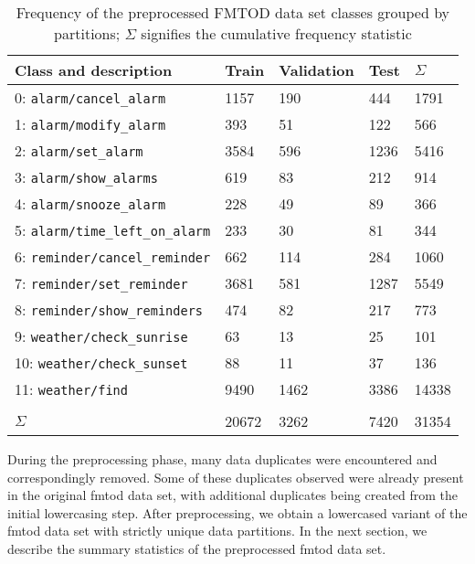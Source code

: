 \begin{table}[t!]
  \centering
  \begin{tabular}{lllll}
    \toprule
    Class and description & Train & Validation & Test & $\Sigma$ \\
    \midrule
    0: \texttt{alarm/cancel\_alarm} & 1157 & 190 & 444 & 1791 \\
    1: \texttt{alarm/modify\_alarm} & 393 & 51 & 122 & 566 \\
    2: \texttt{alarm/set\_alarm} & 3584 & 596 & 1236 & 5416 \\
    3: \texttt{alarm/show\_alarms} & 619 & 83 & 212 & 914 \\
    4: \texttt{alarm/snooze\_alarm} & 228 & 49 & 89 & 366 \\
    5: \texttt{alarm/time\_left\_on\_alarm} & 233 & 30 & 81 & 344 \\
    6: \texttt{reminder/cancel\_reminder} & 662 & 114 & 284 & 1060 \\
    7: \texttt{reminder/set\_reminder} & 3681 & 581 & 1287 & 5549 \\
    8: \texttt{reminder/show\_reminders} & 474 & 82 & 217 & 773 \\
    9: \texttt{weather/check\_sunrise} & 63 & 13 & 25 & 101 \\
    10: \texttt{weather/check\_sunset} & 88 & 11 & 37 & 136 \\
    11: \texttt{weather/find} & 9490 & 1462 & 3386 & 14338 \\[5pt]
    \hline \hline \\[-10pt]
    $\Sigma$ & 20672 & 3262 & 7420 & 31354 \\
    \bottomrule
  \end{tabular}
  \caption{Frequency of the preprocessed FMTOD data set classes grouped by
    partitions; $\Sigma$ signifies the cumulative frequency statistic}
  \label{tab:fmtod}
\end{table}

During the preprocessing phase, many data duplicates were encountered and
correspondingly removed. Some of these duplicates observed were already present
in the original \ac{fmtod} data set, with additional duplicates being created from
the initial lowercasing step. After preprocessing, we obtain a lowercased
variant of the \ac{fmtod} data set with strictly unique data partitions. In the next
section, we describe the summary statistics of the preprocessed \ac{fmtod} data set.

